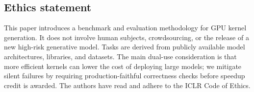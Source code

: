 \subsection*{Ethics statement}

This paper introduces a benchmark and evaluation methodology for GPU kernel generation.
It does not involve human subjects, crowdsourcing, or the release of a new high-risk generative model.
Tasks are derived from publicly available model architectures, libraries, and datasets.
The main dual-use consideration is that more efficient kernels can lower the cost of deploying large models; we mitigate silent failures by requiring production-faithful correctness checks before speedup credit is awarded.
The authors have read and adhere to the ICLR Code of Ethics.
